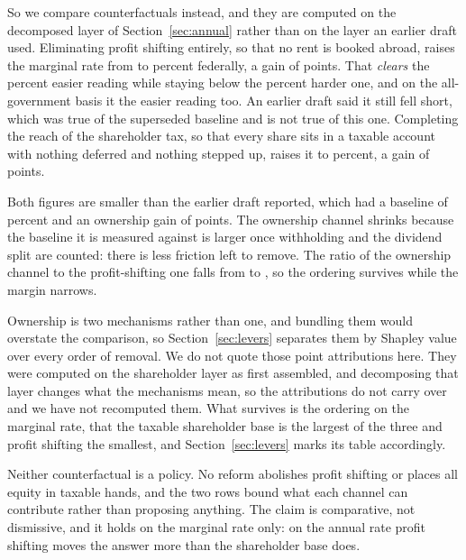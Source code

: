 So we compare counterfactuals instead, and they are computed on the decomposed layer of
Section~\ref{sec:annual} rather than on the layer an earlier draft used. Eliminating profit
shifting entirely, so that no rent is booked abroad, raises the marginal rate from 
to  percent federally, a gain of  points. That
\emph{clears} the  percent easier reading while staying below the
 percent harder one, and on the all-government basis it
 the easier reading too. An earlier draft said it still fell short, which
was true of the superseded baseline and is not true of this one. Completing the reach of the shareholder tax,
so that every share sits in a taxable account with nothing deferred and nothing stepped up,
raises it to  percent, a gain of  points.

Both figures are smaller than the earlier draft reported, which had a baseline of 
percent and an ownership gain of  points. The ownership channel shrinks
because the baseline it is measured against is larger once withholding and the dividend split
are counted: there is less friction left to remove. The ratio of the ownership channel to the
profit-shifting one falls from  to , so the ordering survives
while the margin narrows.

Ownership is two mechanisms rather than one, and bundling them would overstate the comparison, so
Section~\ref{sec:levers} separates them by Shapley value over every order of removal. We do not
quote those point attributions here. They were computed on the shareholder layer as first
assembled, and decomposing that layer changes what the mechanisms mean, so the attributions do
not carry over and we have not recomputed them. What survives is the ordering on the marginal
rate, that the taxable shareholder base is the largest of the three and profit shifting the
smallest, and Section~\ref{sec:levers} marks its table accordingly.

Neither counterfactual is a policy. No reform abolishes profit shifting or places all equity in
taxable hands, and the two rows bound what each channel can contribute rather than proposing
anything. The claim is comparative, not dismissive, and it holds on the marginal rate only: on the annual
rate profit shifting moves the answer more than the shareholder base does.

